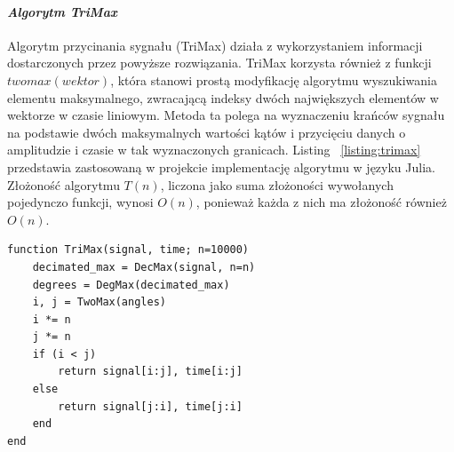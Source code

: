 \paragraph{\textit{Algorytm TriMax}}
Algorytm przycinania sygnału (TriMax) działa z wykorzystaniem informacji dostarczonych przez powyższe rozwiązania. TriMax korzysta również z funkcji $twomax(wektor)$, która stanowi prostą modyfikację algorytmu wyszukiwania elementu maksymalnego, zwracającą indeksy dwóch największych elementów w wektorze w czasie liniowym. Metoda ta polega na wyznaczeniu krańców sygnału na podstawie dwóch maksymalnych wartości kątów i przycięciu danych o amplitudzie i czasie w tak wyznaczonych granicach. Listing ~\ref{listing:trimax} przedstawia zastosowaną w projekcie implementację algorytmu w języku Julia. Złożoność algorytmu $T(n)$, liczona jako suma złożoności wywołanych pojedynczo funkcji, wynosi $O(n)$, ponieważ każda z nich ma złożoność również $O(n)$.
\begin{listing}[H]
\begin{verbatim}
function TriMax(signal, time; n=10000)
    decimated_max = DecMax(signal, n=n)
    degrees = DegMax(decimated_max)
    i, j = TwoMax(angles)
    i *= n
    j *= n
    if (i < j)
        return signal[i:j], time[i:j]
    else
        return signal[j:i], time[j:i]
    end
end
\end{verbatim}
\caption{Implementacja algorytmu TriMax w języku Julia.} \label{listing:trimax}
\end{listing}



